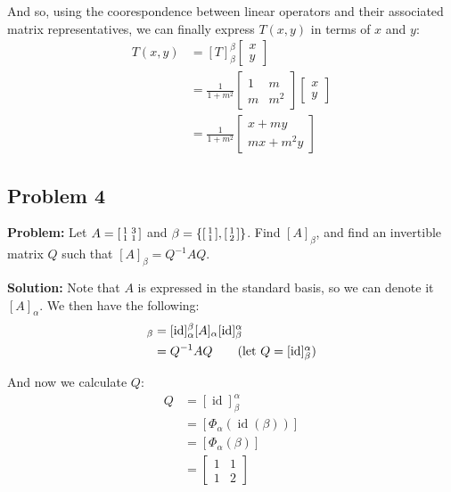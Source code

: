 \documentclass{article}
\newcommand{\icol}[1]{%
  \begin{bsmallmatrix}#1\end{bsmallmatrix}%
}
\begin{document}
And so, using the coorespondence between linear operators and their associated matrix representatives, we can finally express $T(x,y)$ in terms of $x$ and $y$:
\begin{align*}
  T(x,y)&=[T]_{\beta}^{\beta}\begin{bmatrix}
    x\\y
  \end{bmatrix}\\
  &=\frac{1}{1+m^2}\begin{bmatrix}
    1&m\\m&m^2
  \end{bmatrix}\begin{bmatrix}
    x\\y
  \end{bmatrix}\\
  &=\frac{1}{1+m^2}\begin{bmatrix}
    x+my\\mx+m^2y
  \end{bmatrix}
\end{align*}

\subsection*{Problem 4}
\noindent\textbf{Problem:} Let $A=\icol{1&3\\1&1}$ and $\beta=\{\icol{1\\1},\icol{1\\2}\}$. Find $[A]_{\beta}$, and find an invertible matrix $Q$ such that $[A]_{\beta}=Q^{-1}AQ$.
\bigskip

\noindent\textbf{Solution:} Note that $A$ is expressed in the standard basis, so we can denote it $[A]_\alpha$. We then have the following:
\begin{align*}
  [A]_\beta&=[\operatorname{id}]_\alpha^\beta[A]_\alpha[\operatorname{id}]_\beta^\alpha\\
  &=Q^{-1}AQ\tag{let $Q=[\operatorname{id}]_\beta^\alpha$}
\end{align*}

And now we calculate $Q$:
\begin{align*}
  Q&=[\operatorname{id}]_\beta^\alpha\\
  &=[\Phi_\alpha(\operatorname{id}(\beta))]\\
  &=[\Phi_\alpha(\beta)]\\
  &=\begin{bmatrix}
    1&1\\1&2
  \end{bmatrix}
\end{align*}
\end{document}
